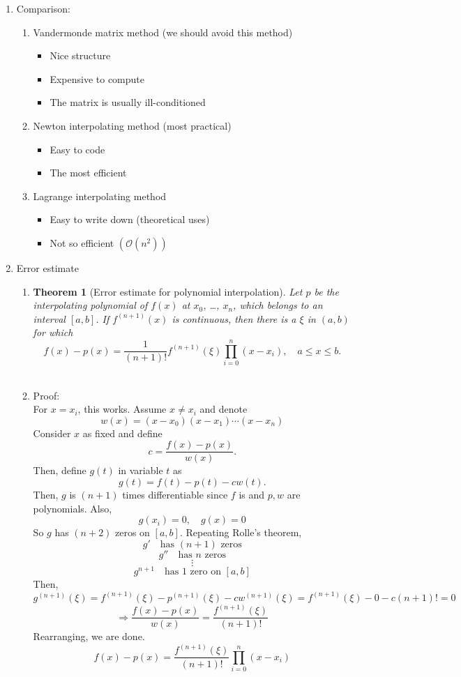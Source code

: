 \documentclass{article}
\newtheorem{thm}{Theorem}[section]
\theoremstyle{remark}
\begin{document}
\begin{enumerate}
\item Comparison:
\begin{enumerate} 
\item Vandermonde matrix method (we should avoid this method)
\begin{itemize}
\item Nice structure
\item Expensive to compute
\item The matrix is usually ill-conditioned 
\end{itemize}
\item Newton interpolating method (most practical)
\begin{itemize}
\item Easy to code
\item The most efficient
\end{itemize}
\item Lagrange interpolating method
\begin{itemize}
\item Easy to write down (theoretical uses)
\item Not so efficient $(\mathcal{O}(n^2))$
\end{itemize}
\end{enumerate}


\item Error estimate
\begin{enumerate}
\item 
\begin{thm}[Error estimate for polynomial interpolation]
Let $p$ be the interpolating polynomial of $f(x)$ at $x_0$, \dots, $x_n$, which belongs to an interval $[a,b]$. If $f^{(n+1)}(x)$ is continuous, then there is a $\xi$ in $(a,b)$ for which
$$
f(x)-p(x) = \frac{1}{(n+1)!}f^{(n+1)}(\xi)\prod_{i=0}^n(x-x_i),\quad a\leq x\leq b.
$$
\\[0.1in]
\end{thm}
\item Proof: \\
For $x=x_i$, this works. Assume $x\neq x_i$ and denote
\[
w(x) = (x-x_0)(x-x_1)\cdots (x-x_n)
\]
Consider $x$ as fixed and define
\[
c = \frac{f(x)-p(x)}{w(x)}.
\]
Then, define $g(t)$ in variable $t$ as
\[
g(t) = f(t)-p(t)-cw(t).
\]
Then, $g$ is $(n+1)$ times differentiable since $f$ is and $p,w$ are polynomials. Also,
\[
g(x_i)=0, \quad g(x)=0
\]
So $g$ has $(n+2)$ zeros on $[a,b]$. Repeating Rolle's theorem, 
\[
g' \quad \text{has $(n+1)$ zeros}
\]
\[
g'' \quad \text{has $n$ zeros}
\]
\[
\vdots
\]
\[
g^{n+1} \quad \text{has $1$ zero on $[a,b]$}
\]
Then,
\[
g^{(n+1)}(\xi) = f^{(n+1)}(\xi) - p^{(n+1)}(\xi) - cw^{(n+1)}(\xi) = f^{(n+1)}(\xi) - 0 - c(n+1)! = 0
\]
\[
\Rightarrow \frac{f(x)-p(x)}{w(x)} = \frac{f^{(n+1)}(\xi)}{(n+1)!}
\]
Rearranging, we are done.
\[
f(x) - p(x) = \frac{f^{(n+1)}(\xi)}{(n+1)!}\prod_{i=0}^n (x-x_i)
\]


\end{enumerate}
\end{enumerate}
\end{document}
